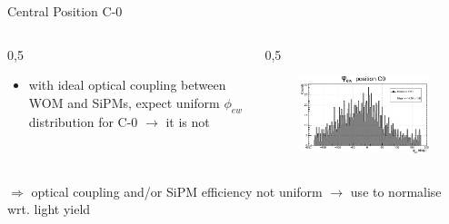 \documentclass[aspectratio=169]{beamer}
\begin{document}
		\begin{frame}{Central Position C-0}
		\begin{columns}
			\begin{column}{0,5\textwidth}
				\centering
				\begin{itemize}
					\item with ideal optical coupling between WOM and SiPMs, expect uniform $\phi_{ew}$ distribution for C-0 $\rightarrow$ it is not
				\end{itemize}
			\end{column}
			\begin{column}{0,5\textwidth}
				\begin{figure}
					\includegraphics[width=\textwidth]{new_alex/C0_normalised_phi_ew_all.pdf}
				\end{figure}
				
			\end{column}
		\end{columns}
		$\Rightarrow$ optical coupling and/or SiPM efficiency not uniform
		$\rightarrow$ use to normalise wrt. light yield
	\end{frame}
	
\end{document}
